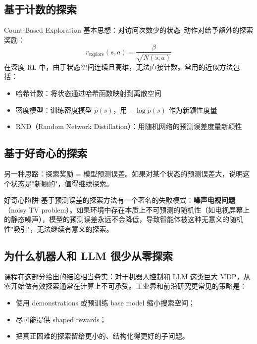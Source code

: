 \documentclass[a4paper]{article}
\begin{document}
\subsection{基于计数的探索}

\begin{importantbox}{Count-Based Exploration}
基本思想：对访问次数少的状态--动作对给予额外的探索奖励：
$$r_{\text{explore}}(s, a) = \frac{\beta}{\sqrt{N(s, a)}}$$
在深度 RL 中，由于状态空间连续且高维，无法直接计数。常用的近似方法包括：
\begin{itemize}
    \item 哈希计数：将状态通过哈希函数映射到离散空间
    \item 密度模型：训练密度模型 $\hat{p}(s)$，用 $-\log \hat{p}(s)$ 作为新颖性度量
    \item RND（Random Network Distillation）：用随机网络的预测误差度量新颖性
\end{itemize}
\end{importantbox}

\subsection{基于好奇心的探索}

另一种思路：探索奖励 = 模型预测误差。如果对某个状态的预测误差大，说明这个状态是"新颖的"，值得继续探索。

\begin{warningbox}{好奇心陷阱}
基于预测误差的探索方法有一个著名的失败模式：\textbf{噪声电视问题}（noisy TV problem）。如果环境中存在本质上不可预测的随机性（如电视屏幕上的静态噪声），模型的预测误差永远不会降低，导致智能体被这种无意义的随机性"吸引"，无法继续有意义的探索。
\end{warningbox}

\subsection{为什么机器人和 LLM 很少从零探索}

课程在这部分给出的结论相当务实：对于机器人控制和 LLM 这类巨大 MDP，从零开始做有效探索通常在计算上不可承受。工业界和前沿研究更常见的策略是：
\begin{itemize}
    \item 使用 demonstrations 或预训练 base model 缩小搜索空间；
    \item 尽可能提供 shaped rewards；
    \item 把真正困难的探索留给更小的、结构化得更好的子问题。
\end{itemize}
\end{document}
